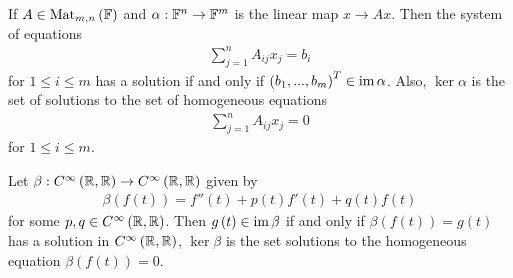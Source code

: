 \documentclass[a4paper]{article}
\begin{document}
\begin{eg}
If $A\in \operatorname{Mat}_{m,n}\left(\mathbb{F}\right)$ and $\alpha: \mathbb{F}^n \to \mathbb{F}^m$ is the linear map $x \to Ax$. Then the system of equations
\begin{equation*}
\begin{aligned}
\sum_{j=1}^n A_{ij} x_j = b_i
\end{aligned}
\end{equation*}
for $1 \leq i \leq m$ has a solution if and only if $\left(b_1,...,b_m\right)^T \in \operatorname{im} \alpha$. Also, $\ker\alpha$ is the set of solutions to the set of homogeneous equations
\begin{equation*}
\begin{aligned}
\sum_{j=1}^n A_{ij}x_j = 0
\end{aligned}
\end{equation*}
for $1 \leq i \leq m$.
\end{eg}

\begin{eg}
Let $\beta: C^\infty \left(\mathbb{R},\mathbb{R}\right) \to C^\infty\left(\mathbb{R},\mathbb{R}\right)$ given by
\begin{equation*}
\begin{aligned}
\beta\left(f\left(t\right)\right) = f''\left(t\right) + p\left(t\right)f'\left(t\right)+q\left(t\right)f\left(t\right)
\end{aligned}
\end{equation*}
for some $p,q \in C^\infty \left(\mathbb{R},\mathbb{R}\right)$. Then $g\left(t\right) \in \operatorname{im} \beta$ if and only if $\beta\left(f\left(t\right)\right) = g\left(t\right)$ has a solution in $C^\infty \left(\mathbb{R},\mathbb{R}\right)$, $\ker \beta$ is the set solutions to the homogeneous equation $\beta\left(f\left(t\right)\right) = 0$.
\end{eg}
\end{document}
